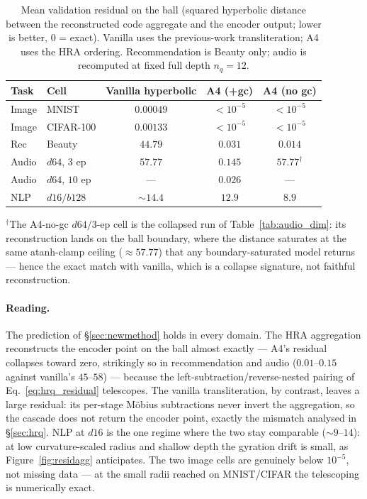 \documentclass[12pt]{report}
\begin{document}
\begin{table}[h]
\centering
\caption{Mean validation residual on the ball (squared hyperbolic distance between the reconstructed code aggregate and the encoder output; lower is better, $0$ = exact). Vanilla uses the previous-work transliteration; A4 uses the HRA ordering. Recommendation is Beauty only; audio is recomputed at fixed full depth $n_q=12$.}
\label{tab:approx}
\begin{tabular}{llccc}
\hline
Task & Cell & Vanilla hyperbolic & A4 (+gc) & A4 (no gc) \\
\hline
Image  & MNIST            & $0.00049$ & $<\!10^{-5}$ & $<\!10^{-5}$ \\
Image  & CIFAR-100        & $0.00133$ & $<\!10^{-5}$ & $<\!10^{-5}$ \\
Rec    & Beauty           & $44.79$   & $0.031$ & $0.014$ \\
Audio  & $d64$, $3$ ep    & $57.77$   & $0.145$ & $57.77^{\dagger}$ \\
Audio  & $d64$, $10$ ep   & ---       & $0.026$ & --- \\
NLP    & $d16/b128$       & $\sim\!14.4$ & $12.9$ & $8.9$ \\
\hline
\end{tabular}
\end{table}

{\small $^{\dagger}$The A4-no-gc $d64/3$-ep cell is the collapsed run of Table~\ref{tab:audio_dim}: its reconstruction lands on the ball boundary, where the distance saturates at the same atanh-clamp ceiling ($\approx 57.77$) that any boundary-saturated model returns --- hence the exact match with vanilla, which is a collapse signature, not faithful reconstruction.}

\paragraph{Reading.} The prediction of \S\ref{sec:newmethod} holds in every domain. The HRA aggregation reconstructs the encoder point on the ball almost exactly --- A4's residual collapses toward zero, strikingly so in recommendation and audio ($0.01$--$0.15$ against vanilla's $45$--$58$) --- because the left-subtraction/reverse-nested pairing of Eq.~\ref{eq:hrq_residual} telescopes. The vanilla transliteration, by contrast, leaves a large residual: its per-stage M\"obius subtractions never invert the aggregation, so the cascade does not return the encoder point, exactly the mismatch analysed in \S\ref{sec:hrq}. NLP at $d16$ is the one regime where the two stay comparable ($\sim\!9$--$14$): at low curvature-scaled radius and shallow depth the gyration drift is small, as Figure~\ref{fig:residagg} anticipates. The two image cells are genuinely below $10^{-5}$, not missing data --- at the small radii reached on MNIST/CIFAR the telescoping is numerically exact.
\end{document}

